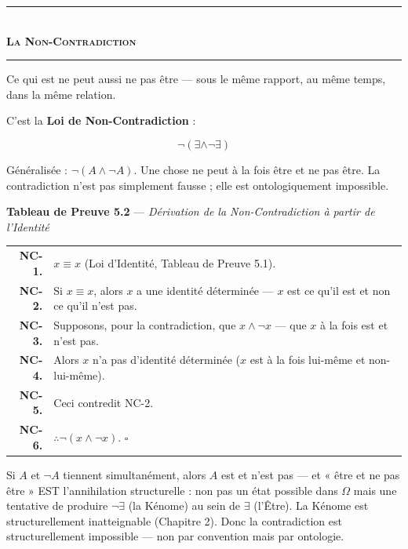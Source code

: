 \documentclass[10pt, openany, oneside]{book}
\renewcommand{\normalsize}{\fontsize{10}{13}\selectfont}
\renewcommand{\footnotesize}{\fontsize{8.5}{11}\selectfont}
\begin{document}
\begin{center}
    \rule{0.3\textwidth}{0.4pt}\\[0.5em]
    {\normalsize\bfseries\scshape La Non-Contradiction}\\[0.3em]
    \rule{0.3\textwidth}{0.4pt}
\end{center}

\vspace{1em}

\noindent Ce qui est ne peut aussi ne pas être --- sous le même rapport, au même temps, dans la même relation.

C'est la \textbf{Loi de Non-Contradiction} :

$$\neg(\exists \wedge \neg\exists)$$

Généralisée : $\neg(A \wedge \neg A)$. Une chose ne peut à la fois être et ne pas être. La contradiction n'est pas simplement fausse ; elle est ontologiquement impossible.

\vspace{0.5em}

\textbf{Tableau de Preuve 5.2} --- \textit{Dérivation de la Non-Contradiction à partir de l'Identité}

\vspace{0.5em}

{\footnotesize
\noindent\begin{tabular}{r p{}}
\textbf{NC-1.} & $x \equiv x$ (Loi d'Identité, Tableau de Preuve 5.1). \\[0.3em]
\textbf{NC-2.} & Si $x \equiv x$, alors $x$ a une identité déterminée --- $x$ est ce qu'il est et non ce qu'il n'est pas. \\[0.3em]
\textbf{NC-3.} & Supposons, pour la contradiction, que $x \wedge \neg x$ --- que $x$ à la fois est et n'est pas. \\[0.3em]
\textbf{NC-4.} & Alors $x$ n'a pas d'identité déterminée ($x$ est à la fois lui-même et non-lui-même). \\[0.3em]
\textbf{NC-5.} & Ceci contredit NC-2. \\[0.3em]
\textbf{NC-6.} & $\therefore \neg(x \wedge \neg x)$. $\square$ \\[0.3em]
\end{tabular}
}

\noindent Si $A$ et $\neg A$ tiennent simultanément, alors $A$ est et n'est pas --- et « être et ne pas être » EST l'annihilation structurelle : non pas un état possible dans $\Omega$ mais une tentative de produire $\neg\exists$ (la Kénome) au sein de $\exists$ (l'Être). La Kénome est structurellement inatteignable (Chapitre 2). Donc la contradiction est structurellement impossible --- non par convention mais par ontologie.
\end{document}
